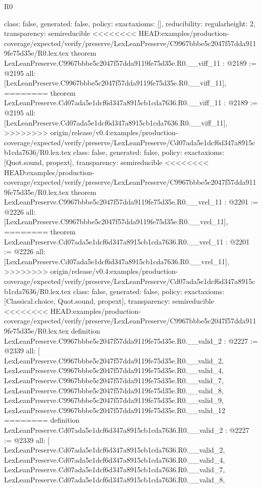 \begin{lexlean}{R0}
\begin{coremodule}
{{{{{{{{{{{{{{{{{{{{{{{{{{{{{{{{{{{{{{{{{{  class: false,
  generated: false,
  policy: exact{axioms: []},
  reducibility: regular{height: 2},
  transparency: semireducible
}
<<<<<<<< HEAD:examples/production-coverage/expected/verify/preserve/LexLeanPreserve/C9967bbbe5c2047f57dda9119fe75d35e/R0.lex.tex
theorem LexLeanPreserve.C9967bbbe5c2047f57dda9119fe75d35e.R0.__viff_11 : @2189 := @2195 {
  all: [LexLeanPreserve.C9967bbbe5c2047f57dda9119fe75d35e.R0.__viff_11],
========
theorem LexLeanPreserve.Cd07ada5e1dcf6d347a8915cb1cda7636.R0.__viff_11 : @2189 := @2195 {
  all: [LexLeanPreserve.Cd07ada5e1dcf6d347a8915cb1cda7636.R0.__viff_11],
>>>>>>>> origin/release/v0.4:examples/production-coverage/expected/verify/preserve/LexLeanPreserve/Cd07ada5e1dcf6d347a8915cb1cda7636/R0.lex.tex
  class: false,
  generated: false,
  policy: exact{axioms: [Quot.sound, propext]},
  transparency: semireducible
}
<<<<<<<< HEAD:examples/production-coverage/expected/verify/preserve/LexLeanPreserve/C9967bbbe5c2047f57dda9119fe75d35e/R0.lex.tex
theorem LexLeanPreserve.C9967bbbe5c2047f57dda9119fe75d35e.R0.__vrel_11 : @2201 := @2226 {
  all: [LexLeanPreserve.C9967bbbe5c2047f57dda9119fe75d35e.R0.__vrel_11],
========
theorem LexLeanPreserve.Cd07ada5e1dcf6d347a8915cb1cda7636.R0.__vrel_11 : @2201 := @2226 {
  all: [LexLeanPreserve.Cd07ada5e1dcf6d347a8915cb1cda7636.R0.__vrel_11],
>>>>>>>> origin/release/v0.4:examples/production-coverage/expected/verify/preserve/LexLeanPreserve/Cd07ada5e1dcf6d347a8915cb1cda7636/R0.lex.tex
  class: false,
  generated: false,
  policy: exact{axioms: [Classical.choice, Quot.sound, propext]},
  transparency: semireducible
}
<<<<<<<< HEAD:examples/production-coverage/expected/verify/preserve/LexLeanPreserve/C9967bbbe5c2047f57dda9119fe75d35e/R0.lex.tex
definition LexLeanPreserve.C9967bbbe5c2047f57dda9119fe75d35e.R0.__valid_2 : @2227 := @2339 {
  all: [
    LexLeanPreserve.C9967bbbe5c2047f57dda9119fe75d35e.R0.__valid_2,
    LexLeanPreserve.C9967bbbe5c2047f57dda9119fe75d35e.R0.__valid_4,
    LexLeanPreserve.C9967bbbe5c2047f57dda9119fe75d35e.R0.__valid_7,
    LexLeanPreserve.C9967bbbe5c2047f57dda9119fe75d35e.R0.__valid_8,
    LexLeanPreserve.C9967bbbe5c2047f57dda9119fe75d35e.R0.__valid_9,
    LexLeanPreserve.C9967bbbe5c2047f57dda9119fe75d35e.R0.__valid_12
========
definition LexLeanPreserve.Cd07ada5e1dcf6d347a8915cb1cda7636.R0.__valid_2 : @2227 := @2339 {
  all: [
    LexLeanPreserve.Cd07ada5e1dcf6d347a8915cb1cda7636.R0.__valid_2,
    LexLeanPreserve.Cd07ada5e1dcf6d347a8915cb1cda7636.R0.__valid_4,
    LexLeanPreserve.Cd07ada5e1dcf6d347a8915cb1cda7636.R0.__valid_7,
    LexLeanPreserve.Cd07ada5e1dcf6d347a8915cb1cda7636.R0.__valid_8,
}}}}}}}}}}}}}}}}}}}}}}}}}}}}}}}}}}}}}}}}}}}}}
\end{coremodule}
\end{lexlean}
